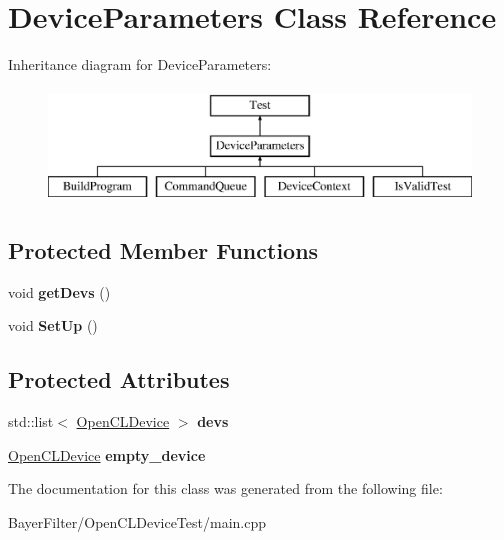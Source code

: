 \hypertarget{class_device_parameters}{\section{Device\-Parameters Class Reference}
\label{class_device_parameters}
}
Inheritance diagram for Device\-Parameters\-:\begin{figure}[H]
\begin{center}
\leavevmode
\includegraphics[height=3.000000cm]{class_device_parameters}
\end{center}
\end{figure}
\subsection*{Protected Member Functions}
\begin{DoxyCompactItemize}
\item 
\hypertarget{class_device_parameters_a0c5569005a1d83491d7cadcd7089acca}{void {\bfseries get\-Devs} ()}\label{class_device_parameters_a0c5569005a1d83491d7cadcd7089acca}

\item 
\hypertarget{class_device_parameters_a33dabf2e287559fde1239592ade0faba}{void {\bfseries Set\-Up} ()}\label{class_device_parameters_a33dabf2e287559fde1239592ade0faba}

\end{DoxyCompactItemize}
\subsection*{Protected Attributes}
\begin{DoxyCompactItemize}
\item 
\hypertarget{class_device_parameters_abef277298c6406f4ebe4f7951985426d}{std\-::list$<$ \hyperlink{class_open_c_l_device}{Open\-C\-L\-Device} $>$ {\bfseries devs}}\label{class_device_parameters_abef277298c6406f4ebe4f7951985426d}

\item 
\hypertarget{class_device_parameters_ae28f4d81e484e9d6707968a892fe3276}{\hyperlink{class_open_c_l_device}{Open\-C\-L\-Device} {\bfseries empty\-\_\-device}}\label{class_device_parameters_ae28f4d81e484e9d6707968a892fe3276}

\end{DoxyCompactItemize}


The documentation for this class was generated from the following file\-:\begin{DoxyCompactItemize}
\item 
Bayer\-Filter/\-Open\-C\-L\-Device\-Test/main.\-cpp\end{DoxyCompactItemize}
